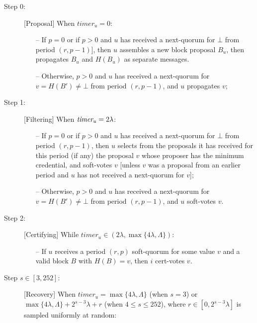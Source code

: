 \documentclass[../main.tex]{subfiles}
\begin{document}
\begin{description}

\item[{\sc Step 0:}] [Proposal]
When $timer_u = 0$:
\begin{itemize}

\item[--] If $p = 0$ or if $p>0$ and $u$ has received a next-quorum for $\bot$ from period $(r,p-1)$], then $u$ assembles a new block proposal $B_u$, then propagates $B_u$ and $H(B_u)$ as separate messages.

\item[--] Otherwise, $p>0$ and $u$ has received a next-quorum for $v=H(B') \neq \bot$ from period $(r,p-1)$, and $u$ propagates $v$;

\end{itemize}

\item[{\sc Step 1:}] [Filtering] When $\textit{timer}_u = 2\lambda$:
\begin{itemize}

\item[--] If $p=0$ or if $p>0$ and $u$ has received a next-quorum for $\bot$ from period $(r,p-1)$,
then $u$ selects from the proposals it has received for this period (if any) the proposal $v$ whose proposer has the minimum credential, 
and soft-votes $v$ 
[unless $v$ was a proposal from an earlier period and $u$ has not received a next-quorum for $v$];

\item[--] Otherwise, $p>0$ and $u$ has received a next-quorum for $v=H(B') \neq \bot$ from period $(r,p-1)$, and $u$ soft-votes $v$.
\end{itemize}

\item[{\sc Step 2:}] [Certifying] While $timer_u\in (2\lambda, \max\{4\lambda,\Lambda\})$:

\begin{itemize}
\item[--] If $u$ receives a period $(r,p)$ soft-quorum for some value $v$ and a valid block $B$ with $H(B)=v$, then $i$ cert-votes $v$.
\end{itemize}

\item[{\sc Step $s \in [3,252]$:}] [Recovery]
When $timer_u = \max\{4\lambda,\Lambda\}$ (when $s=3$) or $\max\{4\lambda,\Lambda\} + 2^{s-3} \lambda + r$ (when $4 \leq s \leq 252$), where $r \in [0,2^{s-3}\lambda]$ is sampled uniformly at random:


\end{description}
\end{document}
